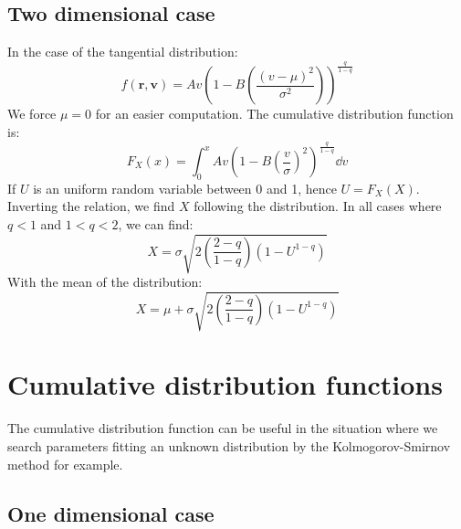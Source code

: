\subsection{Two dimensional case}
\label{sub:two_dimensions_case}

In the case of the tangential distribution:
%
\begin{equation}
    f\left(\textbf{r},\textbf{v}\right)=A v
    {\left(
        1-B\left(\frac{{\left({v-\mu}\right)}^2}{\sigma^2}\right)
    \right)}^{\frac{q}{1-q}}
\end{equation}
%
We force $\mu=0$ for an easier computation. The cumulative distribution
function is:
%
\begin{equation}
    F_X\left(x\right)=\int_0^x A v
    {\left(1-B{\left(\frac{v}{\sigma}\right)}^2\right)}^{\frac{q}{1-q}}\dd v
\end{equation}
%
If $U$ is an uniform random variable between 0 and 1, hence
$U=F_X\left({X}\right)$. Inverting the relation, we find $X$ following the
distribution. In all cases where $q<1$ and $1<q<2$, we can find:
%
\begin{equation}
    X=\sigma\sqrt{2\left(\frac{2-q}{1-q}\right)\left(1-U^{1-q}\right)}
\end{equation}
%
With the mean of the distribution:
%
\begin{equation}
    X=\mu+\sigma\sqrt{2\left(\frac{2-q}{1-q}\right)\left(1-U^{1-q}\right)}
\end{equation}

\section{Cumulative distribution functions}
\label{sec:cumulative_distribution_functions}

The cumulative distribution function can be useful in the situation where we
search parameters fitting an unknown distribution by the Kolmogorov-Smirnov
method for example.

\subsection{One dimensional case}
\label{sub:one_dimension_case}

